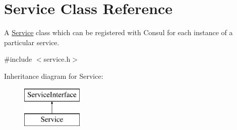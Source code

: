 \hypertarget{classService}{\section{Service Class Reference}
\label{classService}
}


A \hyperlink{classService}{Service} class which can be registered with Consul for each instance of a particular service.  




{\ttfamily \#include $<$service.\-h$>$}

Inheritance diagram for Service\-:\begin{figure}[H]
\begin{center}
\leavevmode
\includegraphics[height=2.000000cm]{classService}
\end{center}
\end{figure}

